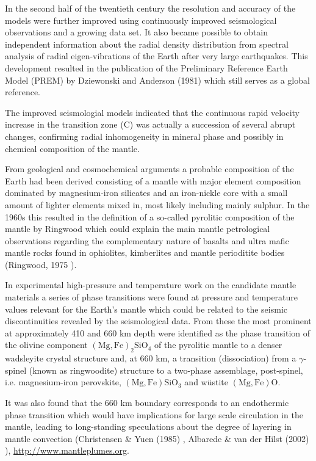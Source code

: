 In the second half of the twentieth century the resolution and 
accuracy of the models were further improved using 
continuously improved seismological observations and a growing 
data set.
It also became possible to obtain independent information about
the radial density distribution from spectral analysis of 
radial eigen-vibrations of the Earth after very large earthquakes.
This development resulted in the publication of the 
Preliminary Reference Earth Model (PREM) by Dziewonski and Anderson (1981) \cite{dzan81}
which still serves as a global reference.

The improved seismologial models indicated
that the continuous rapid velocity increase in the transition zone (C) 
was actually a succession of several abrupt changes,
confirming radial inhomogeneity in mineral phase and possibly in 
chemical composition of the mantle.
 
From geological and cosmochemical arguments a probable composition of 
the Earth had been derived consisting of a mantle with major element
composition dominated by magnesium-iron silicates and an iron-nickle
core with a small amount of lighter elements mixed in,
most likely including mainly sulphur. 
In the 1960s this resulted in the definition of a so-called
pyrolitic composition of the mantle by Ringwood
which could explain the main
mantle petrological observations regarding the complementary
nature of basalts and ultra mafic mantle rocks found in ophiolites, 
kimberlites and mantle perioditite bodies
(Ringwood, 1975 \cite{ring75}). 

In experimental high-pressure and temperature work on the 
candidate mantle materials a series of phase transitions were found
at pressure and temperature values relevant for the Earth's mantle
which could be related to the seismic discontinuities 
revealed by the seismological data.
From these the most prominent at approximately 410 and 660 km depth 
were identified as the phase transition of the olivine component 
$\mathrm{(Mg,Fe)_2 SiO_4}$
of the pyrolitic mantle
to a denser wadsleyite crystal structure and,
at 660 km, a transition (dissociation) from a $\gamma$-spinel 
(known as ringwoodite) structure to a two-phase assemblage, 
post-spinel, i.e.
magnesium-iron perovskite, 
$\mathrm{(Mg,Fe)SiO_3}$ and w\"{u}stite $\mathrm{(Mg,Fe)O}$. 

It was also found that the 660 km boundary corresponds to an
endothermic phase transition which would have implications for 
large scale circulation in the mantle, leading to long-standing 
speculations about the degree of layering in mantle convection
(Christensen \& Yuen (1985) \cite{chyu85},
Albarede \& van der Hilst (2002) \cite{alva02}), \url{http://www.mantleplumes.org}.

